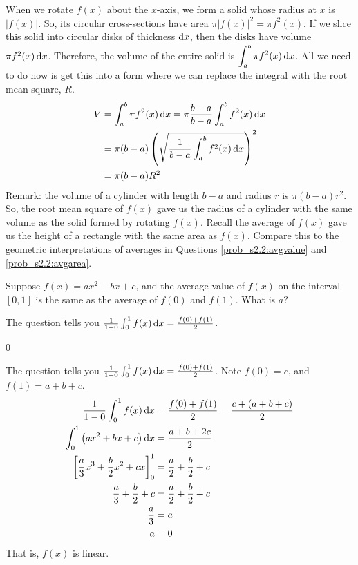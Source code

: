 \begin{solution}
When we rotate $f(x)$ about the $x$-axis, we form a solid whose radius at $x$ is $|f(x)|$. So, its circular cross-sections have area $\pi|f(x)|^2 = \pi f^2(x)$. If we slice this solid into circular disks of thickness $\mathrm{d}x$, then the disks have volume $\pi f^2(x)\,\mathrm{d}x$. Therefore, the volume of the entire solid is $\displaystyle\int_a^b \pi f^2(x)\,\mathrm{d}x$. All we need to do now is get this into a form where we can replace the integral with the root mean square, $R$.
\begin{align*}
V&=\int_a^b \pi f^2(x)\,\mathrm{d}x = \pi\frac{b-a}{b-a}\int_a^b f^2(x)\,\mathrm{d}x\\
&=\pi(b-a)\left(\sqrt{\frac{1}{b-a}\int_a^b f^2(x)\,\mathrm{d}x}\right)^2\\
&=\pi(b-a)R^2
\end{align*}
Remark: the volume of a cylinder with length $b-a$ and radius $r$ is $\pi(b-a)r^2$. So, the root mean square of $f(x)$ gave us the radius of a cylinder with the same volume as the solid formed by rotating $f(x)$. Recall the average of $f(x)$ gave us the height of a rectangle with the same area as $f(x)$. Compare this to the geometric interpretations of averages in Questions \ref{prob_s2.2:avgvalue} and \ref{prob_s2.2:avgarea}.
\end{solution}



\begin{question}\label{prob_s2.2:quadraticaverage}
Suppose $f(x)=ax^2+bx+c$, and the average value of $f(x)$ on the interval $[0,1]$ is the same as the average of $f(0)$ and $f(1)$. What is $a$?
\end{question}
\begin{hint}
The question tells you $\frac{1}{1-0}\int_0^1 f(x)\,\mathrm{d}x = \frac{f(0)+f(1)}{2}$.
\end{hint}
\begin{answer}
0
\end{answer}
\begin{solution}
The question tells you $\frac{1}{1-0}\int_0^1 f(x)\,\mathrm{d}x = \frac{f(0)+f(1)}{2}$. Note $f(0)=c$, and $f(1) = a+b+c$.
\begin{align*}
\frac{1}{1-0}\int_0^1 f(x)\,\mathrm{d}x &= \frac{f(0)+f(1)}{2} = \frac{c+(a+b+c)}{2}\\
\int_0^1 \big(ax^2+bx+c \big)\,\mathrm{d}x&=\frac{a+b+2c}{2}\\
\left[\frac{a}{3}x^3+\frac{b}{2}x^2+cx \right]_0^1&=\frac{a}{2}+\frac{b}{2}+c
\\\frac{a}{3}+\frac{b}{2}+c&=\frac{a}{2}+\frac{b}{2}+c\\
\frac{a}{3}&=a\\
a&=0
\end{align*}
That is, $f(x)$ is linear.
\end{solution}

